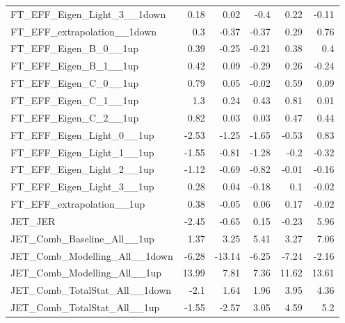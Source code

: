 \begin{table}[htbp]
{\begin{tabular}{lrrrrr}
FT\_EFF\_Eigen\_Light\_3\_\_1down                     & 0.18              & 0.02   & -0.4  & 0.22  & -0.11  \\
FT\_EFF\_extrapolation\_\_1down                       & 0.3               & -0.37  & -0.37 & 0.29  & 0.76   \\
FT\_EFF\_Eigen\_B\_0\_\_1up                           & 0.39              & -0.25  & -0.21 & 0.38  & 0.4    \\
FT\_EFF\_Eigen\_B\_1\_\_1up                           & 0.42              & 0.09   & -0.29 & 0.26  & -0.24  \\
FT\_EFF\_Eigen\_C\_0\_\_1up                           & 0.79              & 0.05   & -0.02 & 0.59  & 0.09   \\
FT\_EFF\_Eigen\_C\_1\_\_1up                           & 1.3               & 0.24   & 0.43  & 0.81  & 0.01   \\
FT\_EFF\_Eigen\_C\_2\_\_1up                           & 0.82              & 0.03   & 0.03  & 0.47  & 0.44   \\
FT\_EFF\_Eigen\_Light\_0\_\_1up                       & -2.53             & -1.25  & -1.65 & -0.53 & 0.83   \\
FT\_EFF\_Eigen\_Light\_1\_\_1up                       & -1.55             & -0.81  & -1.28 & -0.2  & -0.32  \\
FT\_EFF\_Eigen\_Light\_2\_\_1up                       & -1.12             & -0.69  & -0.82 & -0.01 & -0.16  \\
FT\_EFF\_Eigen\_Light\_3\_\_1up                       & 0.28              & 0.04   & -0.18 & 0.1   & -0.02  \\
FT\_EFF\_extrapolation\_\_1up                         & 0.38              & -0.05  & 0.06  & 0.17  & -0.02  \\
JET\_JER                                              & -2.45             & -0.65  & 0.15  & -0.23 & 5.96   \\
JET\_Comb\_Baseline\_All\_\_1up                       & 1.37              & 3.25   & 5.41  & 3.27  & 7.06   \\
JET\_Comb\_Modelling\_All\_\_1down                    & -6.28             & -13.14 & -6.25 & -7.24 & -2.16  \\
JET\_Comb\_Modelling\_All\_\_1up                      & 13.99             & 7.81   & 7.36  & 11.62 & 13.61  \\
JET\_Comb\_TotalStat\_All\_\_1down                    & -2.1              & 1.64   & 1.96  & 3.95  & 4.36   \\
JET\_Comb\_TotalStat\_All\_\_1up                      & -1.55             & -2.57  & 3.05  & 4.59  & 5.2    \\

\end{tabular}}
\end{table}
